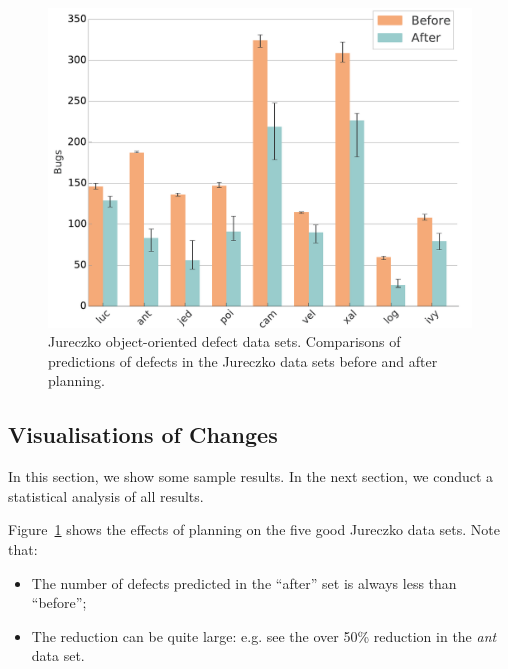 \documentclass[conference]{IEEEtran}
\newcommand{\bi}{\begin{itemize}}
\newcommand{\ei}{\end{itemize}}
\newcommand{\fig}[1]{Figure~\ref{fig:#1}}
\begin{document}
  




\begin{figure}[tbp]
\centering
\includegraphics[width=\linewidth]{figs/histograms.pdf}
\caption{Jureczko object-oriented defect data sets. 
Comparisons of predictions of defects in the Jureczko data sets before and after planning.}
\label{fig:bugs}
\end{figure}

\subsection{Visualisations of Changes}

In this section, we show some sample results. In the next section, we conduct a statistical
analysis of all   results.

\fig{bugs} shows the effects of planning on the five good Jureczko data sets. Note that:
\bi
\item
The number of defects predicted in the ``after'' set is always less than ``before'';
\item
The reduction can be quite large: e.g. see the over 50\% reduction in the {\em ant} data set.
\ei
\end{document}
